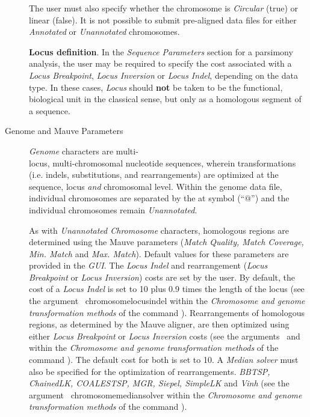 \begin{description}
\indent The user must also specify whether the chromosome is \emph{Circular} (true) or linear (false).
It is not possible to submit pre-aligned data files for either \emph{Annotated} or \emph{Unannotated} 
chromosomes. 

\begin{statement}
\textbf{Locus definition}. In the \emph{Sequence Parameters} section for a parsimony analysis, the user may be required 
to specify the cost associated with a \emph{Locus Breakpoint}, \emph{Locus Inversion} or 
\emph{Locus Indel}, depending on the data type. In these cases, \emph{Locus} should \textbf{not} 
be taken to be the functional, biological unit in the classical sense, 	but only as a homologous 
segment of a sequence.
\end{statement}

\item [Genome and Mauve Parameters] \emph{Genome} characters are multi- \\locus, multi-chromosomal nucleotide 
sequences, wherein transformations (i.e. indels, substitutions, and rearrangements) are optimized 
at the sequence, locus \emph{and} chromosomal level.  Within the genome data file, individual 
chromosomes are separated by the at symbol (``$@$'') and the individual chromosomes remain 
\emph{Unannotated}. 

\indent As with \emph{Unannotated Chromosome} characters, homologous regions are determined 
using the Mauve parameters (\emph{Match Quality, Match Coverage, Min. Match} and \emph {Max. Match}). 
Default values for these parameters are provided in the \emph{GUI}.
The \emph{Locus Indel} and rearrangement (\emph{Locus Breakpoint} or \emph{Locus Inversion}) 
costs are set by the user. By default, the cost of a \emph{Locus Indel} is  set to 10 plus 0.9 times 
the length of the locus (see the argument~ {chromosomelocusindel}  
within the \emph{Chromosome and genome transformation methods} of the command 
).  Rearrangements of homologous regions, as determined  
by the Mauve aligner, are then optimized using either \emph{Locus Breakpoint} or 
\emph{Locus Inversion} costs  (see the arguments~ 
and~ within the \emph{Chromosome 
and genome transformation methods} of the command ). 
The default cost for both is set to 10. A \emph{Median solver} must also be specified for the 
optimization of rearrangements. \emph{BBTSP, ChainedLK, COALESTSP, 
MGR, Siepel, SimpleLK} and \emph{Vinh} (see the argument~
{chromosomemediansolver} within the \emph{Chromosome and genome transformation 
methods} of the command ).


\end{description}
